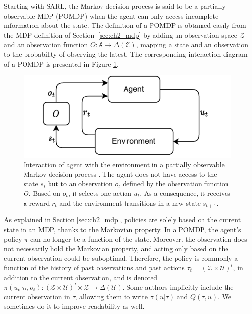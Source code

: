 Starting with SARL, the Markov decision process is said to be a partially observable MDP (POMDP) \citep{KAELBLING199899} when the agent can only access incomplete information about the state.
The definition of a POMDP is obtained easily from the MDP definition of Section~\ref{sec:ch2_mdp} by adding an observation space $\mathcal{Z}$ and an observation function $O:\mathcal{S} \rightarrow \Delta(\mathcal{Z})$, mapping a state and an observation to the probability of observing the latest.
The corresponding interaction diagram of a POMDP is presented in Figure \ref{fig:ch2_pomdp}.

\begin{figure}
    \centering
    \includegraphics[width=.8\linewidth]{tex_thesis/figures/ch2/POMDP.pdf}
    \caption{Interaction of agent with the environment in a partially observable Markov decision process \citep{KAELBLING199899}. The agent does not have access to the state $s_t$ but to an observation $o_t$ defined by the observation function $O$. Based on $o_t$, it selects one action $u_t$. As a consequence, it receives a reward $r_t$ and the environment transitions in a new state $s_{t+1}$.}
    \label{fig:ch2_pomdp}
\end{figure}

As explained in Section \ref{sec:ch2_mdp}, policies are solely based on the current state in an MDP, thanks to the Markovian property.
In a POMDP, the agent's policy $\pi$ can no longer be a function of the state.
Moreover, the observation does not necessarily hold the Markovian property, and acting only based on the current observation could be suboptimal.
Therefore, the policy is commonly a function of the history of past observations and past actions $\tau_t=(\mathcal{Z} \times \mathcal{U})^t$, in addition to the current observation, and is denoted $\pi(u_t|\tau_t,o_t): (\mathcal{Z} \times \mathcal{U})^t \times \mathcal{Z} \rightarrow \Delta(\mathcal{U})$.
Some authors implicitly include the current observation in $\tau$, allowing them to write $\pi(u|\tau)$ and $Q(\tau,u)$. We sometimes do it to improve readability as well.

